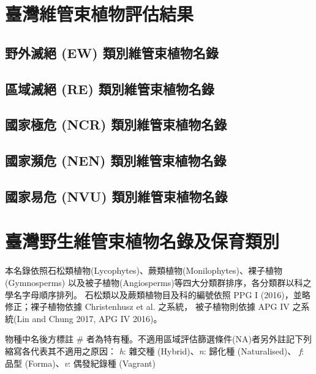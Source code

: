 \chapter{臺灣維管束植物評估結果}



\linespread{1}\selectfont
    \section{野外滅絕 (EW) 類別維管束植物名錄}
    \begin{footnotesize}
    
    \end{footnotesize}
    \section{區域滅絕 (RE) 類別維管束植物名錄}
    \begin{footnotesize}
    
    \end{footnotesize}
    \section{國家極危 (NCR) 類別維管束植物名錄}
    
    \section{國家瀕危 (NEN) 類別維管束植物名錄}
    
    \section{國家易危 (NVU) 類別維管束植物名錄}
    

\chapter{臺灣野生維管束植物名錄及保育類別}

\begin{multicols}{2}
\linespread{1.5}\selectfont \indent 本名錄依照石松類植物(Lycophytes)、蕨類植物(Monilophytes)、裸子植物(Gymnosperms)
以及被子植物(Angiosperms)等四大分類群排序，各分類群以科之學名字母順序排列。
石松類以及蕨類植物目及科的編號依照 PPG I (2016)，並略修正；裸子植物依據
Christenhusz et al. \citeyearpar{Christenhusz:2011wm}之系統，
被子植物則依據 APG IV 之系統(Lin and Chung 2017, APG IV 2016)。

物種中名後方標註 \# 者為特有種。不適用區域評估篩選條件(NA)者另外註記下列縮寫各代表其不適用之原因：
\textit{h}: 雜交種 (Hybrid)、\textit{n}: 歸化種 (Naturalised)、
\textit{f}: 品型 (Forma)、\textit{v}: 偶發紀錄種 (Vagrant) \\

\end{multicols}

